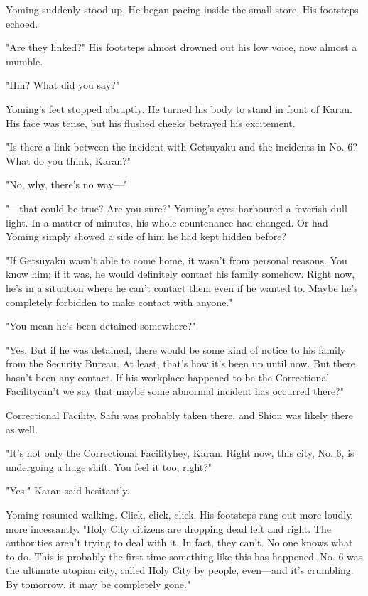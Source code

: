 Yoming suddenly stood up. He began pacing inside the small store. His
footsteps echoed.

"Are they linked?" His footsteps almost drowned out his low voice, now
almost a mumble.

"Hm? What did you say?"

Yoming's feet stopped abruptly. He turned his body to stand in front of
Karan. His face was tense, but his flushed cheeks betrayed his
excitement.

"Is there a link between the incident with Getsuyaku and the incidents
in No. 6? What do you think, Karan?"

"No, why, there's no way---"

"---that could be true? Are you sure?" Yoming's eyes harboured a feverish
dull light. In a matter of minutes, his whole countenance had changed.
Or had Yoming simply showed a side of him he had kept hidden before?

"If Getsuyaku wasn't able to come home, it wasn't from personal reasons.
You know him; if it was, he would definitely contact his family somehow.
Right now, he's in a situation where he can't contact them even if he
wanted to. Maybe he's completely forbidden to make contact with anyone."

"You mean he's been detained somewhere?"

"Yes. But if he was detained, there would be some kind of notice to his
family from the Security Bureau. At least, that's how it's been up until
now. But there hasn't been any contact. If his workplace happened to be
the Correctional Facility\el can't we say that maybe some abnormal
incident has occurred there?"

Correctional Facility. Safu was probably taken there, and Shion was
likely there as well.

"It's not only the Correctional Facility\el hey, Karan. Right now, this
city, No. 6, is undergoing a huge shift. You feel it too, right?"

"Yes," Karan said hesitantly.

Yoming resumed walking. Click, click, click. His footsteps rang out more
loudly, more incessantly. "Holy City citizens are dropping dead left and
right. The authorities aren't trying to deal with it. In fact, they
can't. No one knows what to do. This is probably the first time
something like this has happened. No. 6 was the ultimate utopian city,
called Holy City by people, even---and it's crumbling. By tomorrow, it may
be completely gone."

